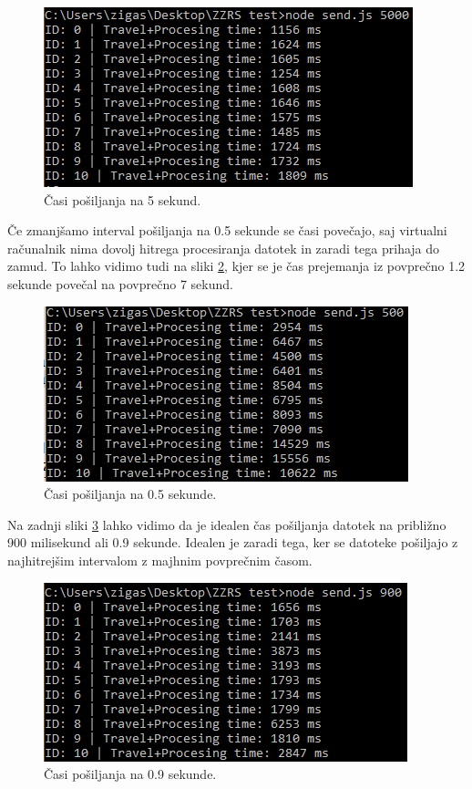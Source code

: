 \begin{figure}[H]
    \centering
    \includegraphics[scale=0.8]{Img/breme1.png}
    \caption{Časi pošiljanja na 5 sekund.}
    \label{fig:7_breme1}
\end{figure}

Če zmanjšamo interval pošiljanja na 0.5 sekunde se časi povečajo, saj virtualni računalnik nima dovolj hitrega procesiranja datotek in zaradi tega prihaja do zamud. To lahko vidimo tudi na sliki \ref{fig:7_breme2}, kjer se je čas prejemanja iz povprečno 1.2 sekunde povečal na povprečno 7 sekund.

\begin{figure}[H]
    \centering
    \includegraphics[scale=0.8]{Img/breme2.png}
    \caption{Časi pošiljanja na 0.5 sekunde.}
    \label{fig:7_breme2}
\end{figure}

Na zadnji sliki \ref{fig:7_breme3} lahko vidimo da je idealen čas pošiljanja datotek na približno 900 milisekund ali 0.9 sekunde. Idealen je zaradi tega, ker se datoteke pošiljajo z najhitrejšim intervalom z majhnim povprečnim časom.

\begin{figure}[H]
    \centering
    \includegraphics[scale=0.8]{Img/breme3.png}
    \caption{Časi pošiljanja na 0.9 sekunde.}
    \label{fig:7_breme3}
\end{figure}

